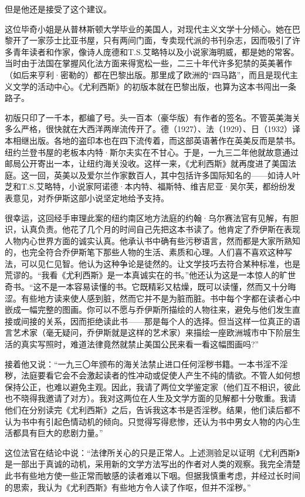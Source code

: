 \par 但是他还是接受了这个建议。
\par 这位毕奇小姐是从普林斯顿大学毕业的美国人，对现代主义文学十分倾心。她在巴黎开了一家莎士比亚书屋，只有两间门面，专卖现代派的书刊杂志，因而吸引了许多青年读者和作家，像诗人庞德和T.S.艾略特以及小说家海明威，都是她的常客。当时由于法国在掌握风化法方面来得宽松一些，二三十年代许多犯禁的英美著作（如后来亨利·密勒的）都在巴黎出版。那里成了欧洲的“四马路”，而且是现代主义文学的活动中心。《尤利西斯》的初版本就在巴黎出版，也算为这本书闯出一条路子。
\par 初版只印了一千本，都编了号。头一百本（豪华版）有作者的签名。不管英美海关多么严格，很快就在大西洋两岸流传开了。德（1927）、法（1929）、日（1932）译本相继出版。各地的盗印本也在四下流传着，而这部英语著作在英美反而是禁书。纽约兰登书屋的老板本内特·斯尔夫实在不甘心。于是，一九三二年他就故意通过邮局公开寄出一本，让纽约海关没收。这样一来，《尤利西斯》就再度进了美国法庭。这一回，英美以及爱尔兰作家数百人，其中包括许多国际知名的——如诗人叶芝和T.S.艾略特，小说家阿诺德·本内特、福斯特、维吉尼亚·吴尔芙，都纷纷发表意见，对乔伊斯这部小说坚定地给予支持。
\par 很幸运，这回经手审理此案的纽约南区地方法庭的约翰·乌尔赛法官有见解，有胆识，认真负责。他花了几个月的时间自己先把这本书读了。他肯定了乔伊斯在表现人物内心世界方面的诚实认真。他承认书中确有些污秽语言，然而都是大家所熟知的，也完全符合乔伊斯笔下那些人物的生活、素质和心理。人们喜不喜欢这种写法，可以见仁见智。他认为这种争论是徒然的。让文学技巧去符合某种标准，也是荒谬的。“我看《尤利西斯》是一本真诚实在的书。”他还认为这是一本惊人的旷世奇书。“这不是一本容易读懂的书。它既精彩又枯燥，既可以读懂，然而又十分晦涩。有些地方读来使人感到脏，然而它并不是为脏而脏。书中每个字都在读者心中嵌成一幅完整的图画。你可以不愿与乔伊斯所描绘的人物往来，避免与他们发生直接或间接的关系，因而拒绝读此书——那是每个人的选择。但当这样一位真正的语言艺术家（毫无疑问，乔伊斯就是这样的艺术家）来描绘一座欧洲城市中下阶层生活的真实写照时，难道法律竟然就禁止美国公民来看一看这幅图画吗?”
\par 接着他又说：“一九三〇年颁布的海关法禁止进口任何淫秽书籍。一本书淫不淫秽，法庭要看它会不会激起读者的性冲动或促使人产生不纯的情欲。不管人如何想保持公正，也难以避免主观。因此，我请了两位文学鉴定家（他们互不相识，彼此也不晓得我邀请了对方）。我对这两位在人生及文学方面的见解都十分敬重。我请他们在分别读完《尤利西斯》之后，告诉我这本书是否淫秽。结果，他们读后都不认为书中有引起色情动机的倾向。只觉得写得悲惨，还认为书中男女人物的内心生活都具有巨大的悲剧力量。”
\par 这位法官在结论中说：“法律所关心的只是正常人。上述测验足以证明《尤利西斯》是一部出于真诚的动机，采用新的文学方法写出的作者对人类的观察。我完全清楚此书有些地方使一些正常而敏感的读者难以下咽。但据我慎重考虑，并经过长时间的思索，我认为《尤利西斯》有些地方令人读了作呕，但并不淫秽。”
